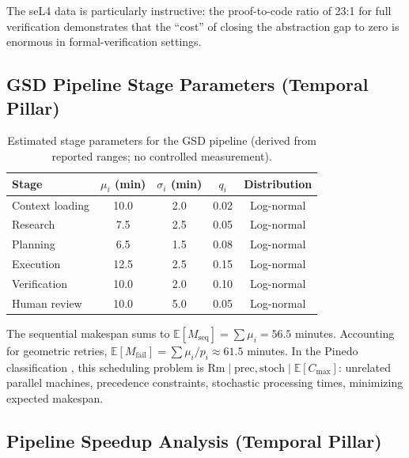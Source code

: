 \documentclass[11pt, a4paper]{googledeepmind}
\newcommand{\E}{\mathbb{E}}
\begin{document}
\begin{appendices}
The seL4 data is particularly instructive: the proof-to-code ratio of 23:1
for full verification demonstrates that the ``cost'' of closing the abstraction
gap to zero is enormous in formal-verification settings.


\subsection{GSD Pipeline Stage Parameters (Temporal Pillar)}
\label{app:gsd-params}

\begin{table}[htbp]
\centering
\caption{Estimated stage parameters for the GSD pipeline (derived from reported ranges; no controlled measurement).}
\label{tab:ext-stages}
\begin{tabular}{lcccc}
\toprule
\textbf{Stage} & $\mu_i$ (min) & $\sigma_i$ (min) & $q_i$ & \textbf{Distribution} \\
\midrule
Context loading & 10.0 & 2.0 & 0.02 & Log-normal \\
Research & 7.5 & 2.5 & 0.05 & Log-normal \\
Planning & 6.5 & 1.5 & 0.08 & Log-normal \\
Execution & 12.5 & 2.5 & 0.15 & Log-normal \\
Verification & 10.0 & 2.0 & 0.10 & Log-normal \\
Human review & 10.0 & 5.0 & 0.05 & Log-normal \\
\bottomrule
\end{tabular}
\end{table}

The sequential makespan sums to $\E[M_{\mathrm{seq}}] = \sum \mu_i = 56.5$ minutes.
Accounting for geometric retries, $\E[M_{\mathrm{fail}}] = \sum \mu_i / p_i \approx 61.5$ minutes.
In the Pinedo classification \citep{pinedo2016scheduling}, this scheduling problem is
$\mathrm{Rm} \mid \mathrm{prec}, \mathrm{stoch} \mid \E[C_{\max}]$:
unrelated parallel machines, precedence constraints, stochastic processing times,
minimizing expected makespan.


\subsection{Pipeline Speedup Analysis (Temporal Pillar)}
\label{app:speedup}


\end{appendices}
\end{document}
